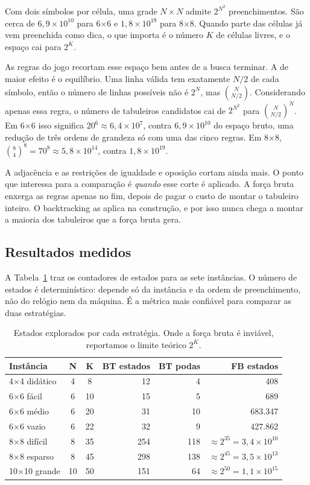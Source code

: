 \documentclass[12pt]{article}
\begin{document}
Com dois símbolos por célula, uma grade $N \times N$ admite $2^{N^2}$ preenchimentos. São cerca de $6{,}9 \times 10^{10}$ para 6$\times$6 e $1{,}8 \times 10^{19}$ para 8$\times$8. Quando parte das células já vem preenchida como dica, o que importa é o número $K$ de células livres, e o espaço cai para $2^K$.

As regras do jogo recortam esse espaço bem antes de a busca terminar. A de maior efeito é o equilíbrio. Uma linha válida tem exatamente $N/2$ de cada símbolo, então o número de linhas possíveis não é $2^N$, mas $\binom{N}{N/2}$. Considerando apenas essa regra, o número de tabuleiros candidatos cai de $2^{N^2}$ para $\binom{N}{N/2}^N$. Em 6$\times$6 isso significa $20^6 \approx 6{,}4 \times 10^7$, contra $6{,}9 \times 10^{10}$ do espaço bruto, uma redução de três ordens de grandeza só com uma das cinco regras. Em 8$\times$8, $\binom{8}{4}^8 = 70^8 \approx 5{,}8 \times 10^{14}$, contra $1{,}8 \times 10^{19}$.

A adjacência e as restrições de igualdade e oposição cortam ainda mais. O ponto que interessa para a comparação é \emph{quando} esse corte é aplicado. A força bruta enxerga as regras apenas no fim, depois de pagar o custo de montar o tabuleiro inteiro. O backtracking as aplica na construção, e por isso nunca chega a montar a maioria dos tabuleiros que a força bruta gera.

\subsection{Resultados medidos}

A Tabela~\ref{tab:estados} traz os contadores de estados para as sete instâncias. O número de estados é determinístico: depende só da instância e da ordem de preenchimento, não do relógio nem da máquina. É a métrica mais confiável para comparar as duas estratégias.

\begin{table}[!ht]
\centering
\caption{Estados explorados por cada estratégia. Onde a força bruta é inviável, reportamos o limite teórico $2^{K}$.}
\label{tab:estados}
\begin{tabular}{|l|c|c|r|r|r|}
\hline
\textbf{Instância} & \textbf{N} & \textbf{K} & \textbf{BT estados} & \textbf{BT podas} & \textbf{FB estados} \\
\hline
4$\times$4 didático & 4  & 8  & 12  & 4   & 408 \\
6$\times$6 fácil    & 6  & 10 & 15  & 5   & 689 \\
6$\times$6 médio    & 6  & 20 & 31  & 10  & 683.347 \\
6$\times$6 vazio    & 6  & 22 & 32  & 9   & 427.862 \\
8$\times$8 difícil  & 8  & 35 & 254 & 118 & $\approx 2^{35} = 3{,}4\times 10^{10}$ \\
8$\times$8 esparso  & 8  & 45 & 298 & 138 & $\approx 2^{45} = 3{,}5\times 10^{13}$ \\
10$\times$10 grande & 10 & 50 & 151 & 64  & $\approx 2^{50} = 1{,}1\times 10^{15}$ \\
\hline
\end{tabular}
\end{table}
\end{document}
